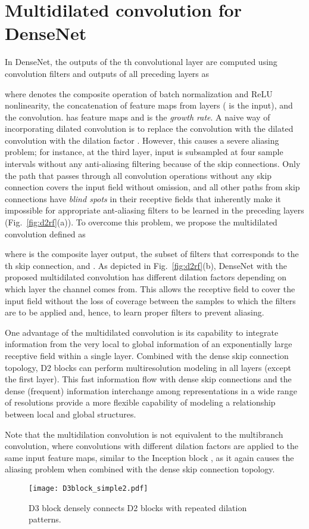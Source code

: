\documentclass[final]{cvpr}
\begin{document}
\section{Multidilated convolution for DenseNet}
\label{sec:d2}
In DenseNet, the outputs of the th convolutional layer  are computed using  convolution filters  and outputs of all preceding layers as

where  denotes the composite operation of batch normalization and ReLU nonlinearity,  the concatenation of feature maps from  layers ( is the input), and  the convolution.  has  feature maps and  is the \textit{growth rate}.
A naive way of incorporating dilated convolution is to replace the convolution  with the dilated convolution  with the dilation factor . However, this causes a severe aliasing problem; for instance, at the third layer, input is subsampled at four sample intervals without any anti-aliasing filtering because of the skip connections. Only the path that passes through all convolution operations without any skip connection covers the input field without omission, and all other paths from skip connections have \textit{blind spots} in their receptive fields that inherently make it impossible for appropriate ant-aliasing filters to be learned in the preceding layers (Fig.~\ref{fig:d2rf}(a)). 
To overcome this problem, we propose the multidilated convolution  defined as

where  is the composite layer output,   the subset of filters that corresponds to the th skip connection, and . As depicted in Fig.~\ref{fig:d2rf}(b), DenseNet with the proposed multidilated convolution has different dilation factors depending on which layer the channel comes from. This allows the receptive field to cover the input field without the loss of coverage between the samples to which the filters are to be applied and, hence, to learn proper filters to prevent aliasing. 

One advantage of the multidilated convolution is its capability to integrate information from the very local to global information of an exponentially large receptive field within a single layer. Combined with the dense skip connection topology, D2 blocks can perform multiresolution modeling in all layers (except the first layer). 
This fast information flow with dense skip connections and the dense (frequent) information interchange among representations in a wide range of resolutions provide a more flexible capability of modeling a relationship between local and global structures.


Note that the multidilation convolution is not equivalent to the multibranch convolution, where convolutions with different dilation factors are applied to the same input feature maps, similar to the Inception block \cite{Szegedy15, Szegedy16}, as it again causes the aliasing problem when combined with the dense skip connection topology.
\begin{figure}[t]
  \centering
\texttt{[image: D3block\_simple2.pdf]}
  \caption{D3 block densely connects D2 blocks with repeated dilation patterns.}
  \label{fig:d3block}
\end{figure}
\end{document}
